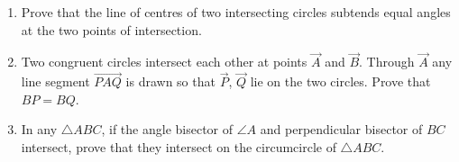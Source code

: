 \begin{enumerate}[label=\thesection.\arabic*,ref=\thesection.\theenumi]
\item Prove that the line of centres of two intersecting circles subtends equal angles at the two points of intersection.
\\
    \solution 
\label{chapters/9/10/6/1}

\item Two congruent circles intersect each other at points $\vec{A}$ and $\vec{B}$. Through $\vec{A}$ any line segment $\vec{PAQ}$ is drawn so that $\vec{P}$, $\vec{Q}$ lie on the two circles. Prove that $BP = BQ$.
\label{chapters/9/10/6/9}
\\
    \solution 

\item In any $\triangle ABC$, if the angle bisector of $\angle A$ and 
    perpendicular bisector of $BC$ intersect, prove that they intersect on 
    the circumcircle of $\triangle ABC$.
\\
    \solution 
\label{chapters/9/10/6/10}


\end{enumerate}
